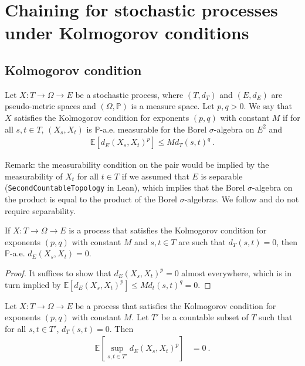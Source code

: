 \section{Chaining for stochastic processes under Kolmogorov conditions}

\subsection{Kolmogorov condition}

\begin{definition}\label{def:IsKolmogorovProcess}
  \mathlibok
Let $X : T \to \Omega \to E$ be a stochastic process, where $(T, d_T)$ and $(E, d_E)$ are pseudo-metric spaces and $(\Omega, \mathbb{P})$ is a measure space.
Let $p, q > 0$.
We say that $X$ satisfies the Kolmogorov condition for exponents $(p,q)$ with constant $M$ if for all $s, t \in T$, $(X_s, X_t)$ is $\mathbb{P}$-a.e. measurable for the Borel $\sigma$-algebra on $E^2$ and
\begin{align*}
  \mathbb{E}[d_E(X_s, X_t)^p] \le M d_T(s, t)^q
  \: .
\end{align*}
\end{definition}

Remark: the measurability condition on the pair would be implied by the measurability of $X_t$ for all $t \in T$ if we assumed that $E$ is separable (\texttt{SecondCountableTopology} in Lean), which implies that the Borel $\sigma$-algebra on the product is equal to the product of the Borel $\sigma$-algebras.
We follow \cite{kratschmer2023kolmogorov} and do not require separability.


\begin{lemma}\label{lem:IsKolmogorovProcess.edist_eq_zero}
  \mathlibok
If $X : T \to \Omega \to E$ is a process that satisfies the Kolmogorov condition for exponents $(p,q)$ with constant $M$ and $s, t \in T$ are such that $d_T(s, t) = 0$, then $\mathbb{P}$-a.e. $d_E(X_s, X_t) = 0$.
\end{lemma}

\begin{proof}\leanok
It suffices to show that $d_E(X_s, X_t)^p = 0$ almost everywhere, which is in turn implied by $\mathbb{E}[d_E(X_s, X_t)^p] \le M d_t(s, t)^q = 0$.
\end{proof}


\begin{lemma}\label{lem:IsKolmogorovProcess.lintegral_sup_rpow_edist_eq_zero}
  \leanok
Let $X : T \to \Omega \to E$ be a process that satisfies the Kolmogorov condition for exponents $(p,q)$ with constant $M$.
Let $T'$ be a countable subset of $T$ such that for all $s, t \in T'$, $d_T(s, t) = 0$.
Then
\begin{align*}
  \mathbb{E}\left[ \sup_{s, t \in T'} d_E(X_s, X_t)^p \right]
  &= 0
  \: .
\end{align*}
\end{lemma}

